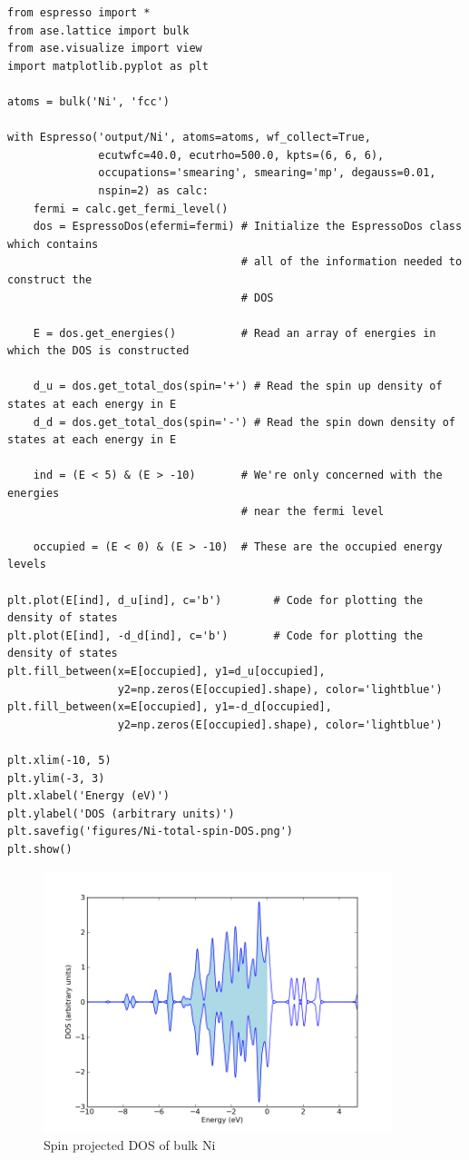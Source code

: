 \documentclass[colorlinks=true,urlcolor=blue,linkcolor=blue,citecolor=red]{article}
\begin{document}
\begin{verbatim}
from espresso import *
from ase.lattice import bulk
from ase.visualize import view
import matplotlib.pyplot as plt

atoms = bulk('Ni', 'fcc')

with Espresso('output/Ni', atoms=atoms, wf_collect=True,
              ecutwfc=40.0, ecutrho=500.0, kpts=(6, 6, 6),
              occupations='smearing', smearing='mp', degauss=0.01,
              nspin=2) as calc:
    fermi = calc.get_fermi_level()
    dos = EspressoDos(efermi=fermi) # Initialize the EspressoDos class which contains
                                    # all of the information needed to construct the
                                    # DOS

    E = dos.get_energies()          # Read an array of energies in which the DOS is constructed

    d_u = dos.get_total_dos(spin='+') # Read the spin up density of states at each energy in E
    d_d = dos.get_total_dos(spin='-') # Read the spin down density of states at each energy in E

    ind = (E < 5) & (E > -10)       # We're only concerned with the energies
                                    # near the fermi level

    occupied = (E < 0) & (E > -10)  # These are the occupied energy levels

plt.plot(E[ind], d_u[ind], c='b')        # Code for plotting the density of states
plt.plot(E[ind], -d_d[ind], c='b')       # Code for plotting the density of states
plt.fill_between(x=E[occupied], y1=d_u[occupied],
                 y2=np.zeros(E[occupied].shape), color='lightblue')                    
plt.fill_between(x=E[occupied], y1=-d_d[occupied],
                 y2=np.zeros(E[occupied].shape), color='lightblue')                    

plt.xlim(-10, 5)
plt.ylim(-3, 3)
plt.xlabel('Energy (eV)')
plt.ylabel('DOS (arbitrary units)')
plt.savefig('figures/Ni-total-spin-DOS.png')
plt.show()
\end{verbatim}

\begin{figure}[H]
\centering
\includegraphics[width=4in]{./figures/Ni-total-spin-DOS.png}
\caption{Spin projected DOS of bulk Ni}
\end{figure}
\end{document}
